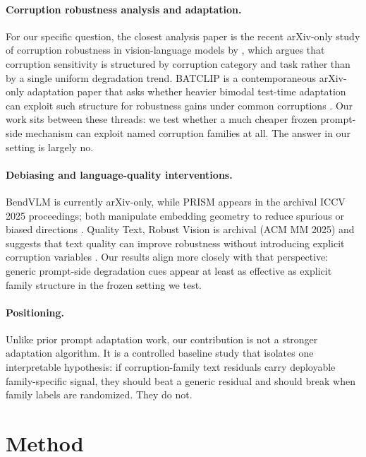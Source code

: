 \documentclass{article}
\begin{document}
\paragraph{Corruption robustness analysis and adaptation.}
For our specific question, the closest analysis paper is the recent arXiv-only study of corruption robustness in vision-language models by \citet{usama2025analysing}, which argues that corruption sensitivity is structured by corruption category and task rather than by a single uniform degradation trend. BATCLIP is a contemporaneous arXiv-only adaptation paper that asks whether heavier bimodal test-time adaptation can exploit such structure for robustness gains under common corruptions \citep{maharana2024enhancing}. Our work sits between these threads: we test whether a much cheaper frozen prompt-side mechanism can exploit named corruption families at all. The answer in our setting is largely no.

\paragraph{Debiasing and language-quality interventions.}
BendVLM is currently arXiv-only, while PRISM appears in the archival ICCV 2025 proceedings; both manipulate embedding geometry to reduce spurious or biased directions \citep{gerych2024bendvlm,molahasani2025prism}. Quality Text, Robust Vision is archival (ACM MM 2025) and suggests that text quality can improve robustness without introducing explicit corruption variables \citep{waseda2025quality}. Our results align more closely with that perspective: generic prompt-side degradation cues appear at least as effective as explicit family structure in the frozen setting we test.

\paragraph{Positioning.}
Unlike prior prompt adaptation work, our contribution is not a stronger adaptation algorithm. It is a controlled baseline study that isolates one interpretable hypothesis: if corruption-family text residuals carry deployable family-specific signal, they should beat a generic residual and should break when family labels are randomized. They do not.

\section{Method}
\label{sec:method}
\end{document}
